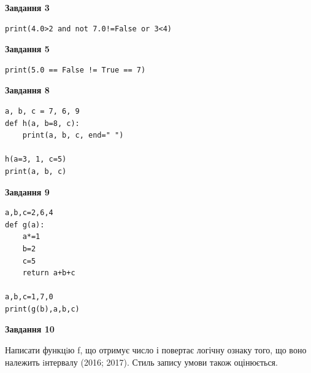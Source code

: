 \documentclass[12pt, ukrainian]{article}
\begin{document}
{\begin {large}
\begin{minipage}[t]{7.5cm}
\end{minipage}
\vline \hspace{6mm}
\begin{minipage}[t]{10.5cm}

\begin{center}
\textbf{Завдання 3}
\end{center}

\begin{verbatim}
print(4.0>2 and not 7.0!=False or 3<4)
\end{verbatim}



\begin{center}
\textbf{Завдання 5}
\end{center}

\begin{verbatim}
print(5.0 == False != True == 7)
\end{verbatim}



\begin{center}
\textbf{Завдання 8}
\end{center}

\begin{verbatim}
a, b, c = 7, 6, 9
def h(a, b=8, c):
    print(a, b, c, end=" ")

h(a=3, 1, c=5)
print(a, b, c)
\end{verbatim}



\begin{center}
\textbf{Завдання 9}
\end{center}

\begin{verbatim}
a,b,c=2,6,4
def g(a):
    a*=1
    b=2
    c=5
    return a+b+c

a,b,c=1,7,0
print(g(b),a,b,c)
\end{verbatim}



\begin{center}
\textbf{Завдання 10}
\end{center}

Написати функцiю f, що отримує число і повертає логічну ознаку того, що воно належить iнтервалу (2016; 2017). Стиль запису умови також оцінюється.\par

\end{minipage}

\end {large}}
\newpage
\end{document}
